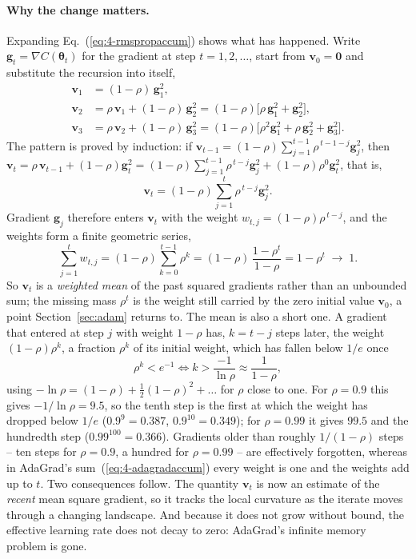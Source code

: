 \paragraph{Why the change matters.}
Expanding Eq.~(\ref{eq:4-rmspropaccum}) shows what has happened.  Write
$\bm{g}_t=\nabla C(\bm{\theta}_t)$ for the gradient at step $t=1,2,\dots$, start
from $\bm{v}_0=\bm{0}$ and substitute the recursion into itself,
\begin{align*}
  \bm{v}_1 &= (1-\rho)\,\bm{g}_1^{2},\\
  \bm{v}_2 &= \rho\,\bm{v}_1+(1-\rho)\,\bm{g}_2^{2}
            = (1-\rho)\bigl[\rho\,\bm{g}_1^{2}+\bm{g}_2^{2}\bigr],\\
  \bm{v}_3 &= \rho\,\bm{v}_2+(1-\rho)\,\bm{g}_3^{2}
            = (1-\rho)\bigl[\rho^{2}\bm{g}_1^{2}+\rho\,\bm{g}_2^{2}+\bm{g}_3^{2}\bigr].
\end{align*}
The pattern is proved by induction: if
$\bm{v}_{t-1}=(1-\rho)\sum_{j=1}^{t-1}\rho^{\,t-1-j}\bm{g}_j^{2}$, then
$\bm{v}_t=\rho\,\bm{v}_{t-1}+(1-\rho)\bm{g}_t^{2}
=(1-\rho)\sum_{j=1}^{t-1}\rho^{\,t-j}\bm{g}_j^{2}+(1-\rho)\rho^{0}\bm{g}_t^{2}$,
that is,
\begin{equation}
  \bm{v}_t = (1-\rho)\sum_{j=1}^{t}\rho^{\,t-j}\bm{g}_j^{2}.
  \label{eq:4-rmspropsum}
\end{equation}
Gradient $\bm{g}_j$ therefore enters $\bm{v}_t$ with the weight
$w_{t,j}=(1-\rho)\rho^{\,t-j}$, and the weights form a finite geometric series,
\[
  \sum_{j=1}^{t}w_{t,j}=(1-\rho)\sum_{k=0}^{t-1}\rho^{k}
  =(1-\rho)\,\frac{1-\rho^{t}}{1-\rho}=1-\rho^{t}\;\longrightarrow\;1 .
\]
So $\bm{v}_t$ is a \emph{weighted mean} of the past squared gradients rather
than an unbounded sum; the missing mass $\rho^{t}$ is the weight still
carried by the zero initial value $\bm{v}_0$, a point Section~\ref{sec:adam}
returns to.  The mean is also a short one.  A gradient that entered at step
$j$ with weight $1-\rho$ has, $k=t-j$ steps later, the weight $(1-\rho)\rho^{k}$,
a fraction $\rho^{k}$ of its initial weight, which has fallen below $1/e$ once
\[
  \rho^{k}<e^{-1}\iff k>\frac{-1}{\ln\rho}\approx\frac{1}{1-\rho},
\]
using $-\ln\rho=(1-\rho)+\tfrac12(1-\rho)^{2}+\dots$ for $\rho$ close to one.
For $\rho=0.9$ this gives $-1/\ln\rho=9.5$, so the tenth step is the first at
which the weight has dropped below $1/e$ ($0.9^{9}=0.387$, $0.9^{10}=0.349$);
for $\rho=0.99$ it gives $99.5$ and the hundredth step ($0.99^{100}=0.366$).
Gradients older than roughly $1/(1-\rho)$ steps -- ten steps for $\rho=0.9$,
a hundred for $\rho=0.99$ -- are effectively forgotten, whereas in AdaGrad's
sum~(\ref{eq:4-adagradaccum}) every weight is one and the weights add up to
$t$.  Two consequences follow.  The quantity $\bm{v}_t$ is now an estimate of the
\emph{recent} mean square gradient, so it tracks the local curvature as the
iterate moves through a changing landscape.  And because it does not grow
without bound, the effective learning rate does not decay to zero: AdaGrad's
infinite memory problem is gone.

